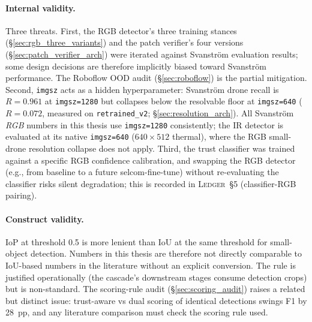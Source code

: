 \paragraph{Internal validity.}
Three threats. First, the RGB detector's three training stances (\S\ref{sec:rgb_three_variants}) and the patch verifier's four versions (\S\ref{sec:patch_verifier_arch}) were iterated against Svanstr\"om evaluation results; some design decisions are therefore implicitly biased toward Svanstr\"om performance. The Roboflow OOD audit (\S\ref{sec:roboflow}) is the partial mitigation. Second, \texttt{imgsz} acts as a hidden hyperparameter: Svanstr\"om drone recall is $R=0.961$ at \texttt{imgsz=1280} but collapses below the resolvable floor at \texttt{imgsz=640} ($R=0.072$, measured on \texttt{retrained\_v2}; \S\ref{sec:resolution_arch}). All Svanstr\"om \emph{RGB} numbers in this thesis use \texttt{imgsz=1280} consistently; the IR detector is evaluated at its native \texttt{imgsz=640} ($640{\times}512$ thermal), where the RGB small-drone resolution collapse does not apply. Third, the trust classifier was trained against a specific RGB confidence calibration, and swapping the RGB detector (e.g., from baseline to a future selcom-fine-tune) without re-evaluating the classifier risks silent degradation; this is recorded in \textsc{Ledger}~\S5 (classifier-RGB pairing).

\paragraph{Construct validity.}
IoP at threshold 0.5 is more lenient than IoU at the same threshold for small-object detection. Numbers in this thesis are therefore not directly comparable to IoU-based numbers in the literature without an explicit conversion. The rule is justified operationally (the cascade's downstream stages consume detection crops) but is non-standard. The scoring-rule audit (\S\ref{sec:scoring_audit}) raises a related but distinct issue: trust-aware vs dual scoring of identical detections swings F1 by 28~pp, and any literature comparison must check the scoring rule used.

